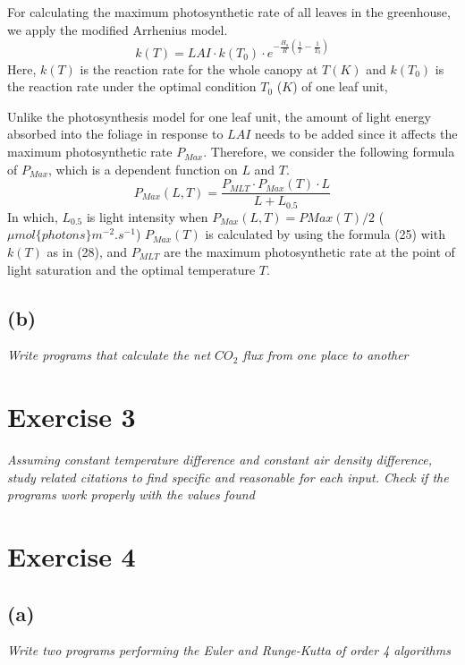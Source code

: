 \documentclass[a4paper]{article}
\begin{document}
For calculating the maximum photosynthetic rate of all leaves in the greenhouse, we apply the modified Arrhenius model.
\begin{equation}
  k(T) = LAI \cdot k(T_0) \cdot e^{-\frac{H_a}{R}(\frac{1}{T} - \frac{1}{T_0})}
\end{equation}
Here, $k(T)$ is the reaction rate for the whole canopy at $T (K)$ and $k(T_0)$ is the reaction rate under the optimal condition $T_0$ ($K$) of one leaf unit,

Unlike the photosynthesis model for one leaf unit, the amount of light energy absorbed into the foliage in response to $LAI$ needs to be added since it affects the maximum photosynthetic rate $P_{Max}$. Therefore, we consider the following formula of $P_{Max}$, which is a dependent function on $L$ and $T$.
\begin{equation}
  P_{Max} (L,T) = \frac{P_{MLT} \cdot P_{Max}(T) \cdot L}{L + L_{0.5}}
\end{equation}
In which, $L_{0.5}$ is light intensity when $P_{Max} (L,T) = PMax(T)/2$ ($\mu mol \{photons\} m^{-2}.s^{-1}$)
$P_{Max}(T)$ is calculated by using the formula (25) with $k(T)$ as in (28), and $P_{MLT}$ are the maximum
photosynthetic rate at the point of light saturation and the optimal temperature $T$.


\subsection{(b)}
\textit{Write programs that calculate the net \(CO_2\) flux from one place to another}




\newpage
\section{Exercise 3}
\textit{Assuming constant temperature difference and constant air density difference, study related citations to find specific and reasonable for each input.
  Check if the programs work properly with the values found}


\newpage
\section{Exercise 4}
\subsection{(a)}
\textit{Write two programs performing the Euler and Runge-Kutta of order 4 algorithms}
\end{document}
